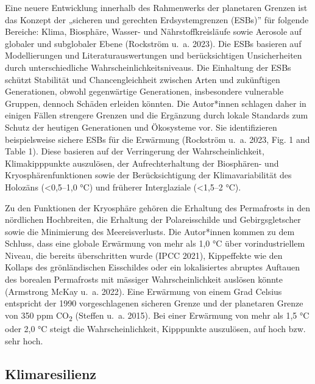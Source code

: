 \documentclass[
  nswissgerman,
  a4paper,
  openany]{book}
\begin{document}
Eine neuere Entwicklung innerhalb des Rahmenwerks der planetaren Grenzen
ist das Konzept der „sicheren und gerechten Erdsystemgrenzen (ESBs)''
für folgende Bereiche: Klima, Biosphäre, Wasser- und Nährstoffkreisläufe
sowie Aerosole auf globaler und subglobaler Ebene (Rockström u.~a.
2023). Die ESBs basieren auf Modellierungen und Literaturauswertungen
und berücksichtigen Unsicherheiten durch unterschiedliche
Wahrscheinlichkeitsniveaus. Die Einhaltung der ESBs schützt Stabilität
und Chancengleichheit zwischen Arten und zukünftigen Generationen,
obwohl gegenwärtige Generationen, insbesondere vulnerable Gruppen,
dennoch Schäden erleiden könnten. Die Autor*innen schlagen daher in
einigen Fällen strengere Grenzen und die Ergänzung durch lokale
Standards zum Schutz der heutigen Generationen und Ökosysteme vor. Sie
identifizieren beispielsweise sichere ESBs für die Erwärmung (Rockström
u.~a. 2023, Fig. 1 and Table 1). Diese basieren auf der Verringerung der
Wahrscheinlichkeit, Klimakipppunkte auszulösen, der Aufrechterhaltung
der Biosphären- und Kryosphärenfunktionen sowie der Berücksichtigung der
Klimavariabilität des Holozäns (\textless0,5--1,0 °C) und früherer
Interglaziale (\textless1,5--2 °C).

Zu den Funktionen der Kryosphäre gehören die Erhaltung des Permafrosts
in den nördlichen Hochbreiten, die Erhaltung der Polareis\-schilde und
Gebirgsgletscher sowie die Minimierung des Meereisverlusts. Die
Autor*innen kommen zu dem Schluss, dass eine globale Erwärmung von mehr
als 1,0 °C über vorindustriellem Niveau, die bereits überschritten wurde
(IPCC 2021), Kippeffekte wie den Kollaps des grönländischen Eisschildes
oder ein lokalisiertes abruptes Auftauen des borealen Permafrosts mit
mässiger Wahrscheinlichkeit auslösen könnte (Armstrong McKay u.~a.
2022). Eine Erwärmung von einem Grad Celsius entspricht der 1990
vorgeschlagenen sicheren Grenze und der planetaren Grenze von 350 ppm
CO\textsubscript{2} ({Steffen u.~a.} 2015). Bei einer Erwärmung von mehr
als 1,5 °C oder 2,0 °C steigt die Wahrscheinlichkeit, Kipppunkte
auszulösen, auf hoch bzw. sehr hoch.

\subsection{Klimaresilienz}\label{klimaresilienz}
\end{document}

